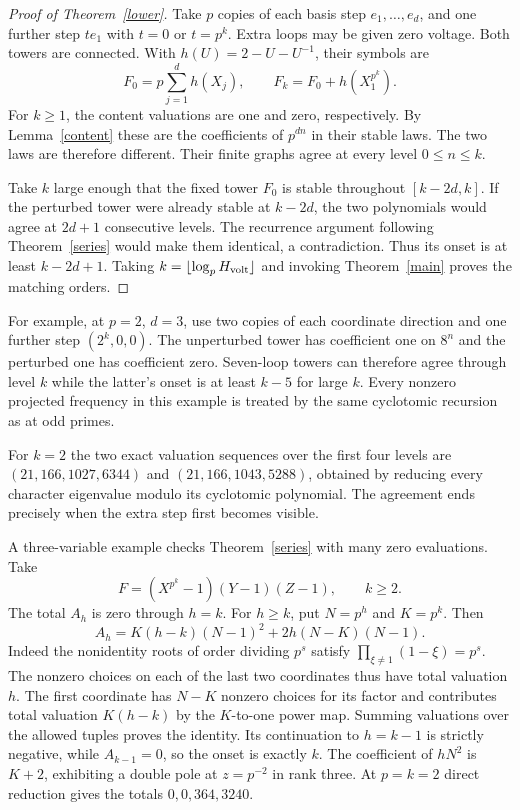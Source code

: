 \documentclass[11pt]{article}
\begin{document}
\begin{proof}[Proof of Theorem~\ref{lower}]
Take $p$ copies of each basis step $e_1,\dots,e_d$, and one further step $t e_1$ with $t=0$ or $t=p^k$. Extra loops may be given zero voltage. Both towers are connected. With $h(U)=2-U-U^{-1}$, their symbols are
\[
F_0=p\sum_{j=1}^d h(X_j),\qquad
F_k=F_0+h(X_1^{p^k}).
\]
For $k\ge1$, the content valuations are one and zero, respectively. By Lemma~\ref{content} these are the coefficients of $p^{dn}$ in their stable laws. The two laws are therefore different. Their finite graphs agree at every level $0\le n\le k$.

Take $k$ large enough that the fixed tower $F_0$ is stable throughout $[k-2d,k]$. If the perturbed tower were already stable at $k-2d$, the two polynomials would agree at $2d+1$ consecutive levels. The recurrence argument following Theorem~\ref{series} would make them identical, a contradiction. Thus its onset is at least $k-2d+1$. Taking $k=\lfloor\log_p H_{\rm volt}\rfloor$ and invoking Theorem~\ref{main} proves the matching orders.
\end{proof}

For example, at $p=2$, $d=3$, use two copies of each coordinate direction and one further step $(2^k,0,0)$. The unperturbed tower has coefficient one on $8^n$ and the perturbed one has coefficient zero. Seven-loop towers can therefore agree through level $k$ while the latter's onset is at least $k-5$ for large $k$. Every nonzero projected frequency in this example is treated by the same cyclotomic recursion as at odd primes.

For $k=2$ the two exact valuation sequences over the first four levels are $(21,166,1027,6344)$ and $(21,166,1043,5288)$, obtained by reducing every character eigenvalue modulo its cyclotomic polynomial. The agreement ends precisely when the extra step first becomes visible.

A three-variable example checks Theorem~\ref{series} with many zero evaluations. Take
\[
F=(X^{p^k}-1)(Y-1)(Z-1),\qquad k\ge2.
\]
The total $A_h$ is zero through $h=k$. For $h\ge k$, put $N=p^h$ and $K=p^k$. Then
\[
 A_h=K(h-k)(N-1)^2+2h(N-K)(N-1).
\]
Indeed the nonidentity roots of order dividing $p^s$ satisfy $\prod_{\xi\ne1}(1-\xi)=p^s$. The nonzero choices on each of the last two coordinates thus have total valuation $h$. The first coordinate has $N-K$ nonzero choices for its factor and contributes total valuation $K(h-k)$ by the $K$-to-one power map. Summing valuations over the allowed tuples proves the identity. Its continuation to $h=k-1$ is strictly negative, while $A_{k-1}=0$, so the onset is exactly $k$. The coefficient of $hN^2$ is $K+2$, exhibiting a double pole at $z=p^{-2}$ in rank three. At $p=k=2$ direct reduction gives the totals $0,0,364,3240$.
\end{document}
